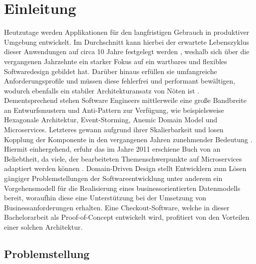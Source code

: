 

\chapter{Einleitung}

Heutzutage werden Applikationen für den langfristigen Gebrauch in produktiver Umgebung entwickelt. Im Durchschnitt kann hierbei der erwartete Lebenszyklus dieser Anwendungen auf circa 10 Jahre festgelegt werden \cite{Tamai.1992}, weshalb sich über die vergangenen Jahrzehnte ein starker Fokus auf ein wartbares und flexibles Softwaredesign gebildet hat. Darüber hinaus erfüllen sie umfangreiche Anforderungsprofile und müssen diese fehlerfrei und performant bewältigen, wodurch ebenfalls ein stabiler Architekturansatz von Nöten ist \cite{Bosch.2001}. Dementsprechend stehen Software Engineers mittlerweile eine große Bandbreite an Entwurfsmustern und Anti-Pattern zur Verfügung, wie beispielsweise Hexagonale Architektur, Event-Storming, Anemic Domain Model und Microservices. Letzteres gewann aufgrund ihrer Skalierbarkeit und losen Kopplung der Komponente in den vergangenen Jahren zunehmender Bedeutung \cite{oreilly.Microservices, Sampaio.2017}. Hiermit einhergehend, erfuhr das im Jahre 2011 erschiene Buch  von \citeauthor{Evans.2011} an Beliebtheit, da viele, der bearbeiteten Themenschwerpunkte auf Microservices adaptiert werden können \cite[S. 130ff.]{Vernon.2015}\cite{Microservice.DDD.2017}. Domain-Driven Design stellt Entwicklern zum Lösen gängiger Problemstellungen der Softwareentwicklung unter anderem ein Vorgehensmodell für die Realisierung eines businessorientierten Datenmodells bereit, woraufhin diese eine Unterstützung bei der Umsetzung von Businessanforderungen erhalten. Eine Checkout-Software, welche in dieser Bachelorarbeit als Proof-of-Concept entwickelt wird, profitiert von den Vorteilen einer solchen Architektur. 


\section{Problemstellung}

